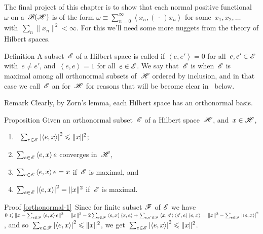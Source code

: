 \documentclass[a]{subfiles}
\begin{document}
\begin{parsec}%
\begin{point}%
The final project of this chapter
is to show that each normal positive functional~$\omega$ 
on a~$\mathscr{B}(\mathscr{H})$
	is of the form 
	$\omega\equiv \sum_{n=0}^\infty\left<x_n,(\,\cdot\,)x_n\right>$
	for some~$x_1,x_2,\dotsc$
	with~$\sum_n\|x_n\|^2<\infty$.
For this we'll need some more nuggets
from the theory of Hilbert spaces.
\end{point}
\begin{point}{Definition}%
A subset~$\mathscr{E}$ of a Hilbert space
is called %
if $\left<e,e'\right>=0$
for all~$e,e'\in\mathscr{E}$ with~$e\neq e'$,
and~$\left<e,e\right>=1$
for all~$e\in\mathscr{E}$.
We say that~$\mathscr{E}$ is 
when~$\mathscr{E}$ is maximal
among all orthonormal  subsets of~$\mathscr{H}$
ordered by inclusion,
and in that case
we call~$\mathscr{E}$ an %
for~$\mathscr{H}$
for reasons that will be become clear in~
below.
\begin{point}{Remark}%
Clearly, by Zorn's lemma,
each Hilbert space has an orthonormal basis.
\end{point}
\end{point}
\begin{point}[orthonormal]{Proposition}%
Given an orthonormal subset~$\mathscr{E}$
of a Hilbert space~$\mathscr{H}$,
and~$x\in \mathscr{H}$,
\begin{enumerate}
\item
\label{orthonormal-1}
%
\ 
 $\sum_{e\in \mathscr{E}}\left|\left<e,x\right>\right|^2
\leqslant \|x\|^2$;
\item
\label{orthonormal-2}
$\sum_{e\in \mathscr{E}} \left<e,x\right>e$
converges in~$\mathscr{H}$,
\item
\label{orthonormal-3}
$\sum_{e\in \mathscr{E}} \left<e,x\right>e=x$
if~$\mathscr{E}$ is maximal, and
\item
\label{orthonormal-4}
%
$\sum_{e\in\mathscr{E}}\left|\left<e,x\right>\right|^2 = \|x\|^2$
if~$\mathscr{E}$ is maximal.
\end{enumerate}
\begin{point}{Proof}%
\ref{orthonormal-1}\ 
Since for finite subset $\mathscr{F}$ of $\mathscr{E}$
we have $0\leqslant \|x-\sum_{e\in \mathscr{F}} \left<e,x\right>e\|^2
= \|x\|^2-2\sum_{e\in \mathscr{F}} \left<e,x\right>\left<x,e\right>
+ \sum_{e,e'\in\mathscr{F}} \left<x,e'\right>\left<e',e\right>\left<e,x\right>
= \|x\|^2-\sum_{e\in\mathscr{F}}\left|\left<e,x\right>\right|^2$,
and so~$\sum_{e\in\mathscr{F}} \left|\left<e,x\right>\right|^2\leqslant \|x\|^2$,
we get~$\sum_{e\in\mathscr{E}}\left|\left<e,x\right>\right|^2\leqslant \|x\|^2$.


\end{point}
\end{point}
\end{parsec}
\end{document}
